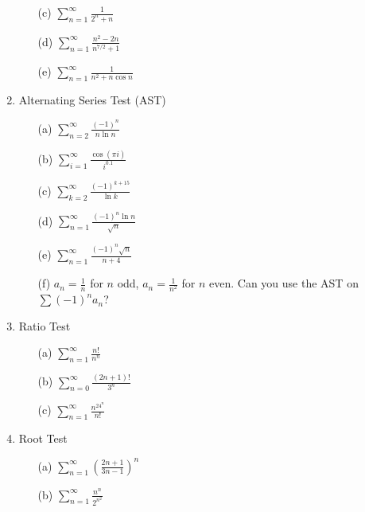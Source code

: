 \documentclass[12pt]{article}
\begin{document}
\begin{enumerate}
\begin{enumerate}
\item[(c)] $\sum_{n=1}^\infty\frac{1}{2^n+n}$

\item[(d)] $\sum_{n=1}^\infty\frac{n^2-2n}{n^{7/2}+1}$

\item[(e)] $\sum_{n=1}^\infty\frac{1}{n^2+n\cos n}$

\end{enumerate}

\setcounter{enumi}{21}
\item Alternating Series Test (AST)
\begin{enumerate}
\item[(a)] $\sum_{n=2}^\infty\frac{(-1)^n}{n\ln n}$

\item[(b)] $\sum_{i=1}^\infty\frac{\cos(\pi i)}{i^{0.1}}$

\item[(c)] $\sum_{k=2}^\infty\frac{(-1)^{k+15}}{\ln k}$

\item[(d)] $\sum_{n=1}^\infty\frac{(-1)^n\ln n}{\sqrt n}$

\item[(e)] $\sum_{n=1}^\infty\frac{(-1)^n\sqrt n}{n+4}$

\item[(f)] $a_n=\frac1n$ for $n$ odd, $a_n=\frac1{n^2}$ for $n$ even. Can you use the AST on $\sum(-1)^na_n$?

\end{enumerate}

\setcounter{enumi}{22}
\item Ratio Test
\begin{enumerate}
\item[(a)] $\sum_{n=1}^\infty\frac{n!}{n^n}$

\item[(b)] $\sum_{n=0}^\infty\frac{(2n+1)!}{3^n}$

\item[(c)] $\sum_{n=1}^\infty\frac{n^24^n}{n!}$

\end{enumerate}

\setcounter{enumi}{23}
\item Root Test
\begin{enumerate}
\item[(a)] $\sum_{n=1}^\infty\left(\frac{2n+1}{3n-1}\right)^n$

\item[(b)] $\sum_{n=1}^\infty\frac{n^n}{2^{n^2}}$


\end{enumerate}
\end{enumerate}
\end{document}
